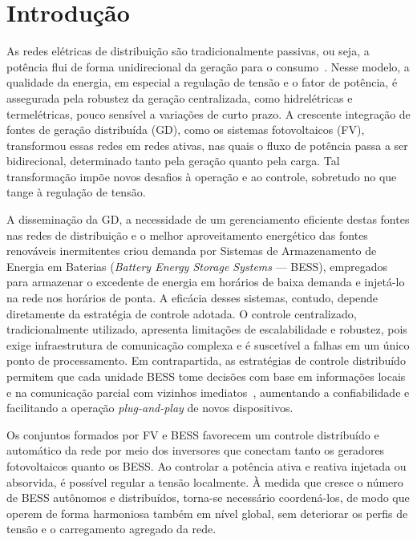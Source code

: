 \chapter{Introdução}
\label{cap:introducao}

As redes elétricas de distribuição são tradicionalmente passivas, ou seja, 
a potência flui de forma unidirecional da geração para o consumo~\cite{grainger1994}. 
Nesse modelo, a qualidade da energia, em especial a regulação de tensão e o fator de potência, 
é assegurada pela robustez da geração centralizada, como hidrelétricas e termelétricas, 
pouco sensível a variações de curto prazo. A crescente integração de fontes de geração distribuída 
(GD), como os sistemas fotovoltaicos (FV), transformou essas redes em redes ativas, nas quais o 
fluxo de potência passa a ser bidirecional, determinado tanto pela geração quanto pela carga. 
Tal transformação impõe novos desafios à operação e ao controle, sobretudo no que tange à regulação 
de tensão.

A disseminação da GD, a necessidade de um gerenciamento eficiente destas 
fontes nas redes de distribuição e o melhor aproveitamento energético das 
fontes renováveis inermitentes criou demanda por Sistemas de Armazenamento 
de Energia em Baterias 
(\emph{Battery Energy Storage Systems} --- BESS), empregados para armazenar o excedente de energia 
em horários de baixa demanda e injetá-lo na rede nos horários de ponta. A eficácia desses sistemas, 
contudo, depende diretamente da estratégia de controle adotada. O controle centralizado, 
tradicionalmente utilizado, apresenta limitações de escalabilidade e robustez, pois exige infraestrutura 
de comunicação complexa e é suscetível a falhas em um único ponto de processamento. Em contrapartida, 
as estratégias de controle distribuído permitem que cada unidade BESS tome decisões com base em 
informações locais e na comunicação parcial com vizinhos imediatos~\cite{nabatirad2022}, aumentando a 
confiabilidade e facilitando a operação \emph{plug-and-play} de novos dispositivos.

Os conjuntos formados por FV e BESS favorecem um controle distribuído e automático da rede por meio dos 
inversores que conectam tanto os geradores fotovoltaicos quanto os BESS. Ao controlar a potência ativa e 
reativa injetada ou absorvida, é possível regular a tensão localmente. À medida que cresce o número de 
BESS autônomos e distribuídos, torna-se necessário coordená-los, de modo que operem de forma harmoniosa 
também em nível global, sem deteriorar os perfis de tensão e o carregamento agregado da rede.

